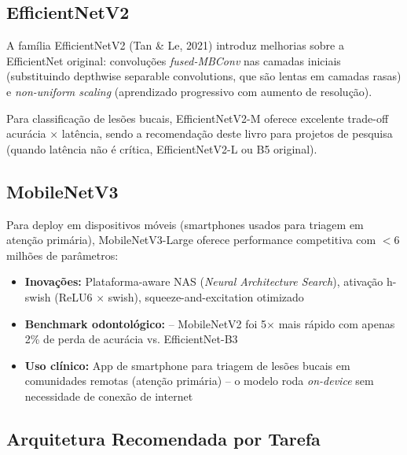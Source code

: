 \subsection{EfficientNetV2}

A família EfficientNetV2 (Tan \& Le, 2021) introduz melhorias sobre a EfficientNet
original: convoluções \textit{fused-MBConv} nas camadas iniciais (substituindo
depthwise separable convolutions, que são lentas em camadas rasas) e
\textit{non-uniform scaling} (aprendizado progressivo com aumento de resolução).

Para classificação de lesões bucais, EfficientNetV2-M oferece excelente trade-off
acurácia $\times$ latência, sendo a recomendação deste livro para projetos de
pesquisa (quando latência não é crítica, EfficientNetV2-L ou B5 original).

\subsection{MobileNetV3}

Para deploy em dispositivos móveis (smartphones usados para triagem em atenção
primária), MobileNetV3-Large oferece performance competitiva com $< 6$ milhões
de parâmetros:

\begin{itemize}
  \item \textbf{Inovações:} Plataforma-aware NAS (\textit{Neural Architecture Search}),
        ativação h-swish (ReLU6 $\times$ swish), squeeze-and-excitation otimizado
  \item \textbf{Benchmark odontológico:}  -- MobileNetV2 foi
        5$\times$ mais rápido com apenas 2\% de perda de acurácia vs. EfficientNet-B3
  \item \textbf{Uso clínico:} App de smartphone para triagem de lesões bucais em
        comunidades remotas (atenção primária) -- o modelo roda \textit{on-device}
        sem necessidade de conexão de internet
\end{itemize}

\subsection{Arquitetura Recomendada por Tarefa}

